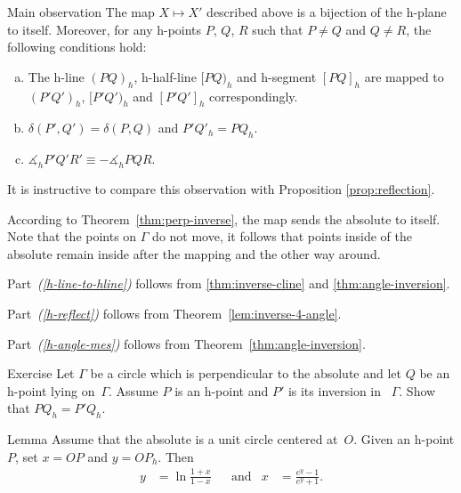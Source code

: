 \begin{thm}{Main observation}\label{thm:main-observ}
The map $X\mapsto X'$ described above is a bijection of the h-plane to itself. 
Moreover, for any h-points $P$, $Q$, $R$ such that $P\ne Q$ and $Q\ne R$, the following conditions hold:
\begin{enumerate}[(a)]
\item\label{h-line-to-hline} The h-line $(PQ)_h$, h-half-line $[PQ)_h$ and h-segment $[PQ]_h$ are mapped to  $(P'Q')_h$, $[P'Q')_h$ and $[P'Q']_h$ correspondingly.
\item\label{h-reflect} $\delta(P',Q')=\delta(P,Q)$ and $P'Q'_h=PQ_h$.
\item\label{h-angle-mes} 
$\measuredangle_h P'Q'R'\equiv-\measuredangle_h PQR$.
\end{enumerate}

\end{thm}

It is instructive to compare this observation with Proposition \ref{prop:reflection}.

According to Theorem~\ref{thm:perp-inverse}, the map sends the absolute to itself. 
Note that the points on $\Gamma$ do not move, it follows that points inside of the absolute remain inside after the mapping and the other way around. 


Part~\textit{(\ref{h-line-to-hline})} follows from \ref{thm:inverse-cline} and \ref{thm:angle-inversion}.

Part~\textit{(\ref{h-reflect})} follows from Theorem~\ref{lem:inverse-4-angle}.

Part~\textit{(\ref{h-angle-mes})}  follows from Theorem~\ref{thm:angle-inversion}.
\qeds


\begin{thm}{Exercise}\label{ex:h-reflection}
Let $\Gamma$ be a circle which is perpendicular to the absolute and let $Q$ be an h-point lying on~$\Gamma$.
Assume $P$ is an h-point and $P'$ is its inversion in ~$\Gamma$.
Show that $PQ_h=P'Q_h$.
\end{thm}

\begin{thm}{Lemma}\label{lem:O-h-dist}
Assume that the absolute is a unit circle centered at~$O$.
Given an h-point $P$, set $x=OP$ and $y=OP_h$.
Then
\begin{align*}
y&=\ln\frac{1+x}{1-x}
&
&\text{and}
&
x&=\frac{e^y-1}{e^y+1}.
\end{align*}
 
\end{thm}


